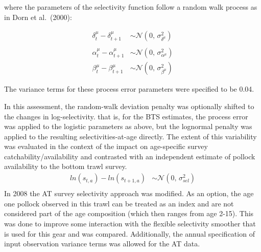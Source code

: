 \documentclass[11pt,
  english,
  a4paper,
]{article}
\begin{document}
where the parameters of the selectivity function follow a random walk process as in Dorn et al.~(2000):

\leavevmode\tagmcend\tagstructend\par


\begin{align}
    \delta_t^\mu  -  \delta_{t+1}^\mu     &\sim \mathcal{N}(0,\,\sigma_{\delta^\mu}^{2}) \\
    \\
    \alpha_t^\mu  -  \alpha_{t+1}^\mu     &\sim \mathcal{N}(0,\,\sigma_{\alpha^\mu}^{2}) \\
    \beta_t^\mu  -  \beta_{t+1}^\mu     &\sim \mathcal{N}(0,\,\sigma_{\beta^\mu}^{2}) 
\end{align}

\leavevmode\tagmcend\tagstructend\par


The variance terms for these process error parameters were specified to be 0.04.

\leavevmode\tagmcend\tagstructend\par


In this assessment, the random-walk deviation penalty was optionally shifted to the changes in log-selectivity. that is, for the BTS estimates, the process error was applied to the logistic parameters as above, but the lognormal penalty was applied to the resulting selectivities-at-age directly. The extent of this variability was evaluated in the context of the impact on age-specific survey catchability/availability and contrasted with an independent estimate of pollock availability to the bottom trawl survey. \begin{align}
    {ln(s_{t,a})}  -  {ln(s_{t+1,a})}  &\sim \mathcal{N}(0,\,\sigma_{sel}^{2}) \\
\end{align} In 2008 the AT survey selectivity approach was modified. As an option, the age one pollock observed in this trawl can be treated as an index and are not considered part of the age composition (which then ranges from age 2-15). This was done to improve some interaction with the flexible selectivity smoother that is used for this gear and was compared. Additionally, the annual specification of input observation variance terms was allowed for the AT data.
\end{document}
